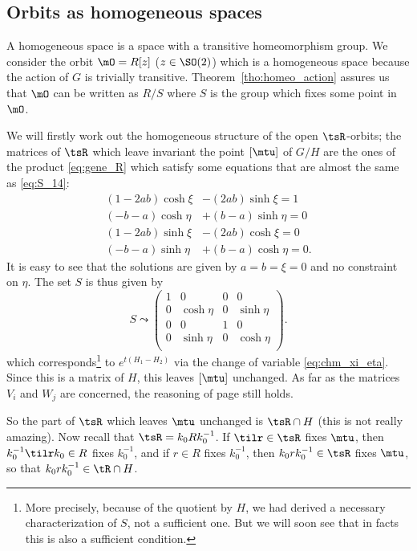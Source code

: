 \subsection{Orbits as homogeneous spaces}
A homogeneous space is a space with a transitive homeomorphism group. We consider the orbit $\mO=R[z]$ ($z\in \SO(2)$) which is a homogeneous space because the action of $G$ is trivially transitive. Theorem~\ref{tho:homeo_action} assures us that $\mO$ can be written as $R/S$ where $S$ is the group which fixes some point in $\mO$.

We will firstly work out the homogeneous structure of the open $\tsR$-orbits; the matrices of $\tsR$ which leave invariant the point $[\mtu]$ of $G/H$ are the ones of the product \eqref{eq:gene_R} which satisfy some equations that are almost the same as \eqref{eq:S_14}:
\begin{subequations}
\begin{align}
  (1-2ab)\cosh\xi&-(2ab)\sinh\xi=1   \\
  (-b-a)\cosh\eta&+(b-a)\sinh\eta=0   \\
  (1-2ab)\sinh\xi&-(2ab)\cosh\xi=0    \\
  (-b-a)\sinh\eta&+(b-a)\cosh\eta=0.
\end{align}
\end{subequations}
It is easy to see that the solutions are given by $a=b=\xi=0$ and no constraint on $\eta$. The set $S$ is thus given by
\begin{equation}
S\leadsto
\begin{pmatrix}
 1 & 0 & 0 & 0 \\
 0 & \cosh\eta & 0 & \sinh\eta \\
 0 & 0 & 1 & 0 \\
 0 & \sinh\eta & 0 & \cosh\eta \\
\end{pmatrix}.
\end{equation}
which corresponds\footnote{More precisely, because of the quotient by $H$, we had derived a necessary characterization of $S$, not a sufficient one. But we will soon see that in facts this is also a sufficient condition.} to $ e^{t(H_{1}-H_{2})}$ via the change of variable \eqref{eq:chm_xi_eta}. Since this is a matrix of $H$, this leaves $[\mtu]$ unchanged. As far as the matrices $V_i$ and $W_j$ are concerned, the reasoning of page \pageref{pg:influence_V_W} still holds.

So the part of $\tsR$ which leaves $\mtu$ unchanged is $\tsR\cap H$ (this is not really amazing). Now recall that $\tsR=k_0Rk_0^{-1}$. If $\tilr\in\tsR$ fixes $\mtu$, then $k_0^{-1}\tilr k_0\in R$ fixes $k_0^{-1}$, and if $r\in R$ fixes $k_0^{-1}$, then $k_0rk_0^{-1}\in\tsR$ fixes $\mtu$, so that $k_0rk_0^{-1}\in\tR\cap H$.

